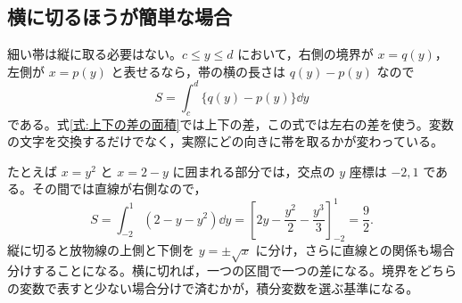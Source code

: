 \subsection{横に切るほうが簡単な場合}

細い帯は縦に取る必要はない。$c\leq y\leq d$ において，右側の境界が $x=q(y)$，左側が $x=p(y)$ と表せるなら，帯の横の長さは $q(y)-p(y)$ なので
\begin{equation}\label{式:左右の差の面積}
S=\int_c^d\{q(y)-p(y)\}\dd y
\end{equation}
である。式\eqref{式:上下の差の面積}では上下の差，この式では左右の差を使う。変数の文字を交換するだけでなく，実際にどの向きに帯を取るかが変わっている。

たとえば $x=y^2$ と $x=2-y$ に囲まれる部分では，交点の $y$ 座標は $-2,1$ である。その間では直線が右側なので，
\[
S=\int_{-2}^1(2-y-y^2)\dd y
 =\left[2y-\frac{y^2}{2}-\frac{y^3}{3}\right]_{-2}^1
 =\frac92.
\]
縦に切ると放物線の上側と下側を $y=\pm\sqrt x$ に分け，さらに直線との関係も場合分けすることになる。横に切れば，一つの区間で一つの差になる。境界をどちらの変数で表すと少ない場合分けで済むかが，積分変数を選ぶ基準になる。

